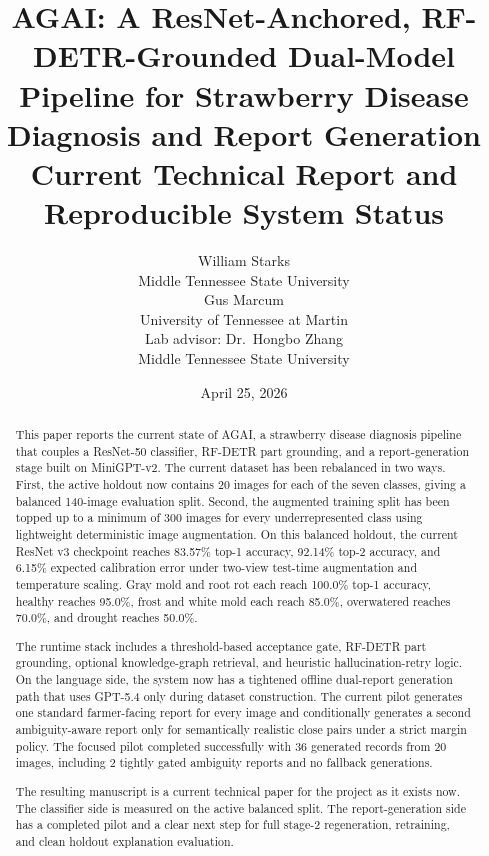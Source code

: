 \documentclass[11pt]{article}
\title{AGAI: A ResNet-Anchored, RF-DETR-Grounded Dual-Model Pipeline for Strawberry Disease Diagnosis and Report Generation\\[0.4em]
\large Current Technical Report and Reproducible System Status}
\author{
\begin{tabular}{c}
William Starks\\
Middle Tennessee State University\\[0.5em]
Gus Marcum\\
University of Tennessee at Martin\\[0.5em]
Lab advisor: Dr.\ Hongbo Zhang\\
Middle Tennessee State University
\end{tabular}
}
\date{April 25, 2026}
\begin{document}
\maketitle

\begin{abstract}
This paper reports the current state of AGAI, a strawberry disease diagnosis pipeline that couples a ResNet-50 classifier, RF-DETR part grounding, and a report-generation stage built on MiniGPT-v2. The current dataset has been rebalanced in two ways. First, the active holdout now contains 20 images for each of the seven classes, giving a balanced 140-image evaluation split. Second, the augmented training split has been topped up to a minimum of 300 images for every underrepresented class using lightweight deterministic image augmentation. On this balanced holdout, the current ResNet v3 checkpoint reaches 83.57\% top-1 accuracy, 92.14\% top-2 accuracy, and 6.15\% expected calibration error under two-view test-time augmentation and temperature scaling. Gray mold and root rot each reach 100.0\% top-1 accuracy, healthy reaches 95.0\%, frost and white mold each reach 85.0\%, overwatered reaches 70.0\%, and drought reaches 50.0\%.

The runtime stack includes a threshold-based acceptance gate, RF-DETR part grounding, optional knowledge-graph retrieval, and heuristic hallucination-retry logic. On the language side, the system now has a tightened offline dual-report generation path that uses GPT-5.4 only during dataset construction. The current pilot generates one standard farmer-facing report for every image and conditionally generates a second ambiguity-aware report only for semantically realistic close pairs under a strict margin policy. The focused pilot completed successfully with 36 generated records from 20 images, including 2 tightly gated ambiguity reports and no fallback generations.

The resulting manuscript is a current technical paper for the project as it exists now. The classifier side is measured on the active balanced split. The report-generation side has a completed pilot and a clear next step for full stage-2 regeneration, retraining, and clean holdout explanation evaluation.
\end{abstract}












\end{document}
